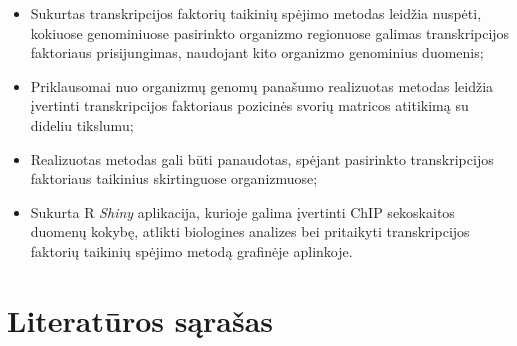 \documentclass[12pt]{article}
\begin{document}
\begin{itemize}
    \item Sukurtas transkripcijos faktorių taikinių spėjimo metodas leidžia
        nuspėti, kokiuose genominiuose pasirinkto organizmo regionuose
        galimas transkripcijos faktoriaus prisijungimas, naudojant kito
        organizmo genominius duomenis;
    \item Priklausomai nuo organizmų genomų panašumo realizuotas metodas
        leidžia įvertinti transkripcijos faktoriaus pozicinės svorių matricos
        atitikimą su dideliu tikslumu;
    \item Realizuotas metodas gali būti panaudotas, spėjant pasirinkto
        transkripcijos faktoriaus taikinius skirtinguose organizmuose;
    \item Sukurta R \emph{Shiny} aplikacija, kurioje galima įvertinti ChIP
        sekoskaitos duomenų kokybę, atlikti biologines analizes bei pritaikyti
        transkripcijos faktorių taikinių spėjimo metodą grafinėje aplinkoje.
\end{itemize}

\newpage


\section{Literatūros sąrašas}
\end{document}
